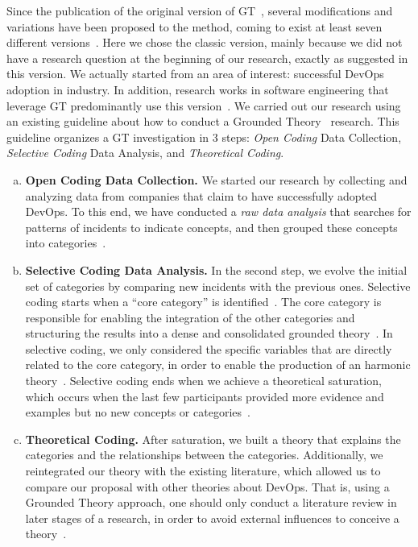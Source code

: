 Since the publication of the original version of GT~\cite{glase1967discovery},
several modifications and variations have been proposed to the method, coming to
exist at least seven different versions~\cite{denzin2007grounded}.
Here we chose the classic version, mainly because we did not have a research
question at the beginning of our research, exactly as suggested in this
version. We actually started from an area of interest: successful DevOps adoption
in industry. In addition, research works in software engineering that leverage GT
predominantly use this version~\cite{stol2016grounded}.
We carried out our research using an existing
guideline about how to conduct a
Grounded Theory~\cite{adolph2011using} research. This guideline organizes
a GT investigation in 3 steps: \emph{Open Coding} Data Collection,
\emph{Selective Coding} Data Analysis, and \emph{Theoretical Coding}.

\begin{enumerate}[(a)]
\item {\bf Open Coding Data Collection.} We started our research
  by collecting and analyzing data from companies that claim to have
  successfully adopted DevOps.
  To this end, we have conducted a \emph{raw data analysis} that searches for patterns of
  incidents to indicate concepts,  and then grouped these concepts into
  categories~\cite{stol2016grounded}.

\item {\bf Selective Coding Data Analysis.} In the second step, we evolve
  the initial set of
  categories by comparing new incidents with the previous ones. Selective coding
  starts when a ``core category'' is identified~\cite{stol2016grounded}.
  The core category is responsible for enabling the integration of the other
  categories and structuring the results into a dense and consolidated grounded
  theory~\cite{jantunen2014using}. In selective coding, we only considered the
  specific variables that are directly related to the core category, in order to
  enable the production of an harmonic theory~\cite{coleman2007using,hoda2011impact}.
  Selective coding ends when we achieve a theoretical saturation, which occurs
  when the last few participants provided more evidence and examples but no new
  concepts or categories~\cite{glase1967discovery}.

\item {\bf Theoretical Coding.} After saturation, we built a theory that
explains the categories and the relationships between the categories.
Additionally, we reintegrated our theory with the existing literature, which allowed us to compare our proposal
 with other theories about DevOps. That is, using a Grounded Theory approach,
 one should only conduct a literature review in later stages of a research,
in order to avoid external influences to conceive a theory~\cite{adolph2012reconciling}.

\end{enumerate}


